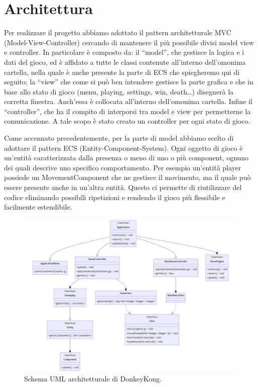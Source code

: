 \documentclass[a4paper,12pt]{report}
\begin{document}
\section{Architettura}

Per realizzare il progetto abbiamo adottato il pattern architetturale MVC (Model-View-Controller) cercando di mantenere il più possibile divisi model view e controller. In particolare è composto da: il “model”, che gestisce la logica e i dati del gioco, ed è affidato a tutte le classi contenute all’interno dell’omonima cartella, nella quale è anche presente la parte di ECS che spiegheremo qui di seguito; la “view” che come si può ben intendere gestisce la parte grafica e che in base allo stato di gioco (menu, playing, settings, win, death…) disegnerà la corretta finestra. Anch’essa è collocata all’interno dell’omonima cartella. Infine il “controller”, che ha il compito di interporsi tra model e view per permetterne la comunicazione. A tale scopo è stato creato un controller per ogni stato di gioco. 

Come accennato precedentemente, per la parte di model abbiamo scelto di adottare il pattern ECS (Entity-Component-System). Ogni oggetto di gioco è un’entità caratterizzata dalla presenza o meno di uno o più component, ognuno dei quali descrive uno specifico comportamento. Per esempio un'entità player possiede un MovementComponent che ne gestisce il movimento, ma il quale può essere presente anche in un’altra entità. Questo ci permette di riutilizzare del codice eliminando possibili ripetizioni e rendendo il gioco più flessibile e facilmente estendibile.

\begin{figure}[H]
\centering{}
\includegraphics[width=1.25\textwidth]{img/architettura.png}
\caption{Schema UML architetturale di DonkeyKong.}
\label{img:architettura}
\end{figure}
\end{document}
